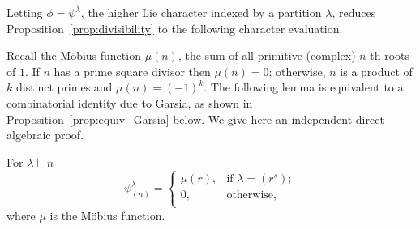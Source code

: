 Letting $\phi = \psi^\lambda$, the higher Lie character indexed by a partition $\lambda$, reduces Proposition~\ref{prop:divisibility} to the following character evaluation. 

Recall the M\"obius function $\mu(n)$, the sum of all primitive (complex) $n$-th roots of $1$. If $n$ has a prime square divisor then $\mu(n)=0$; otherwise, $n$ is a product of $k$ distinct primes and $\mu(n)=(-1)^k$. 
The following lemma is equivalent to a combinatorial identity due to Garsia, as shown in  Proposition~\ref{prop:equiv_Garsia} below. We give here an independent direct algebraic proof.

\begin{lemma}\label{lem:char_eval_cycles}
    For $\lambda \vdash n$
    \[
        \psi^\lambda_{(n)} =
        \begin{cases} 
            \mu(r), &\text{if } \lambda = (r^s);\\
	       0, &\text{otherwise,}\\
        \end{cases}
    \]
    where $\mu$ is the M\"obius function.
\end{lemma}


